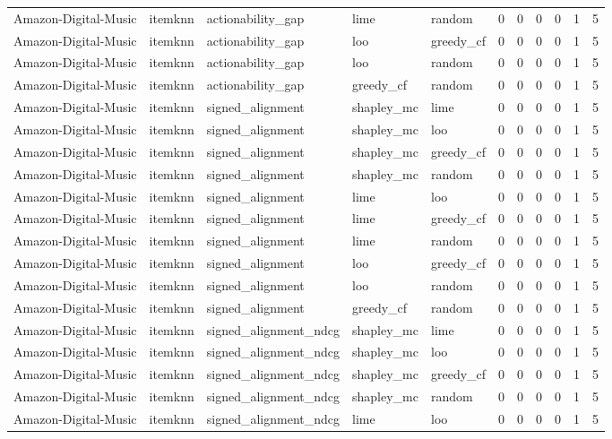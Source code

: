 \begin{table}[t]
{\begin{tabular}{lllllrrrrrr}
Amazon-Digital-Music & itemknn & actionability\_gap & lime & random & 0 & 0 & 0 & 0 & 1 & 5 \\
Amazon-Digital-Music & itemknn & actionability\_gap & loo & greedy\_cf & 0 & 0 & 0 & 0 & 1 & 5 \\
Amazon-Digital-Music & itemknn & actionability\_gap & loo & random & 0 & 0 & 0 & 0 & 1 & 5 \\
Amazon-Digital-Music & itemknn & actionability\_gap & greedy\_cf & random & 0 & 0 & 0 & 0 & 1 & 5 \\
Amazon-Digital-Music & itemknn & signed\_alignment & shapley\_mc & lime & 0 & 0 & 0 & 0 & 1 & 5 \\
Amazon-Digital-Music & itemknn & signed\_alignment & shapley\_mc & loo & 0 & 0 & 0 & 0 & 1 & 5 \\
Amazon-Digital-Music & itemknn & signed\_alignment & shapley\_mc & greedy\_cf & 0 & 0 & 0 & 0 & 1 & 5 \\
Amazon-Digital-Music & itemknn & signed\_alignment & shapley\_mc & random & 0 & 0 & 0 & 0 & 1 & 5 \\
Amazon-Digital-Music & itemknn & signed\_alignment & lime & loo & 0 & 0 & 0 & 0 & 1 & 5 \\
Amazon-Digital-Music & itemknn & signed\_alignment & lime & greedy\_cf & 0 & 0 & 0 & 0 & 1 & 5 \\
Amazon-Digital-Music & itemknn & signed\_alignment & lime & random & 0 & 0 & 0 & 0 & 1 & 5 \\
Amazon-Digital-Music & itemknn & signed\_alignment & loo & greedy\_cf & 0 & 0 & 0 & 0 & 1 & 5 \\
Amazon-Digital-Music & itemknn & signed\_alignment & loo & random & 0 & 0 & 0 & 0 & 1 & 5 \\
Amazon-Digital-Music & itemknn & signed\_alignment & greedy\_cf & random & 0 & 0 & 0 & 0 & 1 & 5 \\
Amazon-Digital-Music & itemknn & signed\_alignment\_ndcg & shapley\_mc & lime & 0 & 0 & 0 & 0 & 1 & 5 \\
Amazon-Digital-Music & itemknn & signed\_alignment\_ndcg & shapley\_mc & loo & 0 & 0 & 0 & 0 & 1 & 5 \\
Amazon-Digital-Music & itemknn & signed\_alignment\_ndcg & shapley\_mc & greedy\_cf & 0 & 0 & 0 & 0 & 1 & 5 \\
Amazon-Digital-Music & itemknn & signed\_alignment\_ndcg & shapley\_mc & random & 0 & 0 & 0 & 0 & 1 & 5 \\
Amazon-Digital-Music & itemknn & signed\_alignment\_ndcg & lime & loo & 0 & 0 & 0 & 0 & 1 & 5 \\

\end{tabular}}
\end{table}

